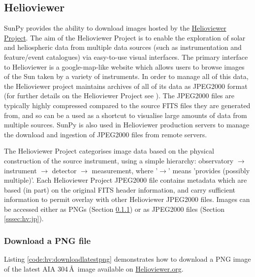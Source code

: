 \subsection{Helioviewer}\label{ssec:hv}

SunPy provides the ability to download images hosted by the
\href{http://helioviewer.org}{Helioviewer Project}.  
The aim of the Helioviewer Project is to enable
the exploration of solar and heliospheric data from multiple data
sources (such as instrumentation and feature/event catalogues) via
easy-to-use visual interfaces.  The primary interface to Helioviewer is a
google-map-like website which allows users to browse images of the Sun
taken by a variety of instruments. In order to manage all of this data, the Helioviewer
project maintains archives of all of its data as JPEG2000 format (for further
details on the Helioviewer Project see \citep{muller2009}). The
JPEG2000 files are typically highly compressed compared to the source
FITS files they are generated from, and so can be a used as a shortcut
to visualise large amounts of data from multiple sources.  SunPy is
also used in Helioviewer production servers to manage the download and
ingestion of JPEG2000 files from remote servers.

The Helioviewer Project categorises image data based on the physical
construction of the source instrument, using a simple hierarchy:
observatory $\rightarrow$ instrument $\rightarrow$ detector
$\rightarrow$ measurement, where '$\rightarrow$' means 'provides
(possibly multiple)'.  Each Helioviewer Project JPEG2000 file contains
metadata which are based (in part) on the original FITS header
information, and carry sufficient information to permit overlay with
other Helioviewer JPEG2000 files. Images can be accessed either as
PNGs (Section \ref{sssec:hv:png}) or as JPEG2000 files (Section
\ref{sssec:hv:jp}).

\subsubsection{Download a PNG file}\label{sssec:hv:png}


Listing \ref{code:hv:downloadlatestpng} demonstrates how to download a
PNG image of the latest AIA 304$\,$\AA\ image available on
\url{Helioviewer.org}.

